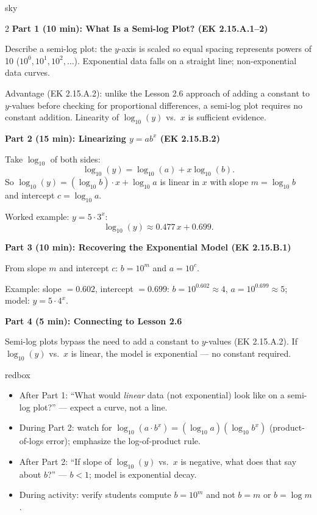 \documentclass[10pt]{article}
\begin{document}
\begin{skillbox}[Lesson]{sky}
\begin{multicols}{2}
\textbf{Part 1 (10 min): What Is a Semi-log Plot? (EK 2.15.A.1--2)}

Describe a semi-log plot: the $y$-axis is scaled so equal spacing represents powers of 10
($10^0, 10^1, 10^2, \ldots$).  Exponential data falls on a straight line; non-exponential
data curves.

Advantage (EK 2.15.A.2): unlike the Lesson 2.6 approach of adding a constant to $y$-values
before checking for proportional differences, a semi-log plot requires no constant addition.
Linearity of $\log_{10}(y)$ vs.\ $x$ is sufficient evidence.

\columnbreak

\textbf{Part 2 (15 min): Linearizing $y = ab^x$ (EK 2.15.B.2)}

Take $\log_{10}$ of both sides:
\[
  \log_{10}(y) = \log_{10}(a) + x\log_{10}(b).
\]
So $\log_{10}(y) = (\log_{10} b)\cdot x + \log_{10} a$ is linear in $x$ with slope
$m = \log_{10} b$ and intercept $c = \log_{10} a$.

Worked example: $y = 5\cdot3^x$:
\[
  \log_{10}(y) \approx 0.477\,x + 0.699.
\]

\textbf{Part 3 (10 min): Recovering the Exponential Model (EK 2.15.B.1)}

From slope $m$ and intercept $c$: $b = 10^m$ and $a = 10^c$.

Example: slope $= 0.602$, intercept $= 0.699$:
$b = 10^{0.602}\approx 4$, $a = 10^{0.699}\approx 5$; model: $y = 5\cdot4^x$.

\textbf{Part 4 (5 min): Connecting to Lesson 2.6}

Semi-log plots bypass the need to add a constant to $y$-values (EK 2.15.A.2).  If
$\log_{10}(y)$ vs.\ $x$ is linear, the model is exponential --- no constant required.
\end{multicols}
\end{skillbox}

\begin{skillbox}{redbox}
\begin{itemize}[leftmargin=1.2em,itemsep=2pt,topsep=0pt]
  \item After Part 1: ``What would \emph{linear} data (not exponential) look like on a
        semi-log plot?'' --- expect a curve, not a line.
  \item During Part 2: watch for $\log_{10}(a\cdot b^x) = (\log_{10}a)(\log_{10}b^x)$
        (product-of-logs error); emphasize the log-of-product rule.
  \item After Part 2: ``If slope of $\log_{10}(y)$ vs.\ $x$ is negative, what does that
        say about $b$?'' --- $b < 1$; model is exponential decay.
  \item During activity: verify students compute $b = 10^m$ and not $b = m$ or $b = \log m$.
\end{itemize}
\end{skillbox}
\end{document}
